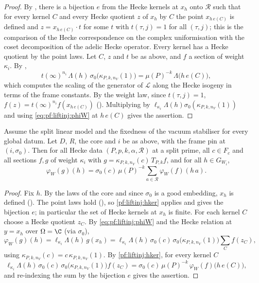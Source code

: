 \begin{proof}
By , there is a bijection $e$ from the Hecke kernels at $x_h$ onto $\mathcal R$
such that for every kernel $C$ and every Hecke quotient $z$ of $x_h$ by $C$ the point $x_{h\,e(C)}$ is defined and $z=x_{h\,e(C)}\cdot t$ for some $t$ with
$t(\tau,j)=1$ for all $(\tau,j)$; this is the comparison of the Hecke correspondence on the complex uniformisation with the coset decomposition of the
adelic Hecke operator. Every kernel has a Hecke quotient by the point laws. Let $C$, $z$ and $t$ be as above, and $f$ a section of weight $\kappa_i$. By
,
\[
t(\infty)^{n_i}\,\Lambda(h)\,\sigma_0\bigl(\kappa_{P,k,n_V}(1)\bigr)=\mu(P)^{-k}\,\Lambda\bigl(h\,e(C)\bigr),
\]
which computes the scaling of the generator of $\mathcal L$ along the Hecke isogeny in terms of the frame constants. By the weight law, since
$t(\tau,j)=1$, $f(z)=t(\infty)^{n_i}f(x_{h\,e(C)})$ (). Multiplying by $\ell_{\kappa_i}\Lambda(h)\sigma_0(\kappa_{P,k,n_V}(1))$
and using \eqref{eq:pf:liftinj:phiW} at $h\,e(C)$ gives the assertion.
\end{proof}

\begin{proposition}\label{pf:liftinj:hread}
Assume the split linear model and the fixedness of the vacuum stabiliser for every global datum. Let $D$, $R$, the core and $i$ be as above, with the frame
pin at $(i,\sigma_0)$. Then for all Hecke data $(P,p,k,\alpha,\mathcal R)$ at a split prime, all $c\in F_c$ and all sections $f,g$ of weight $\kappa_i$ with
$g=\kappa_{P,k,n_V}(c)\,T_{P,k}f$, and for all $h\in G_{W_i}$,
\[
\varphi_W(g)(h)=\sigma_0(c)\,\mu(P)^{-k}\sum_{a\in\mathcal R}\varphi_W(f)(h\,a).
\]
\end{proposition}

\begin{proof}
Fix $h$. By the laws of the core and since $\sigma_0$ is a good embedding, $x_h$ is defined
(). The point laws hold
(), so \cref{pf:liftinj:hker} applies and gives the bijection $e$; in particular the set of Hecke
kernels at $x_h$ is finite. For each kernel $C$ choose a Hecke quotient $z_C$. By \eqref{eq:pf:liftinj:phiW} and the Hecke relation at $y=x_h$ over
$\Omega=\C$ (via $\sigma_0$),
\[
\varphi_W(g)(h)=\ell_{\kappa_i}\Lambda(h)\,g(x_h)=\ell_{\kappa_i}\Lambda(h)\,\sigma_0(c)\,\sigma_0\bigl(\kappa_{P,k,n_V}(1)\bigr)\sum_Cf(z_C),
\]
using $\kappa_{P,k,n_V}(c)=c\,\kappa_{P,k,n_V}(1)$. By \cref{pf:liftinj:hker}, for every kernel $C$
\[
\ell_{\kappa_i}\Lambda(h)\,\sigma_0(c)\,\sigma_0\bigl(\kappa_{P,k,n_V}(1)\bigr)f(z_C)=\sigma_0(c)\,\mu(P)^{-k}\,\varphi_W(f)\bigl(h\,e(C)\bigr),
\]
and re-indexing the sum by the bijection $e$ gives the assertion.
\end{proof}

